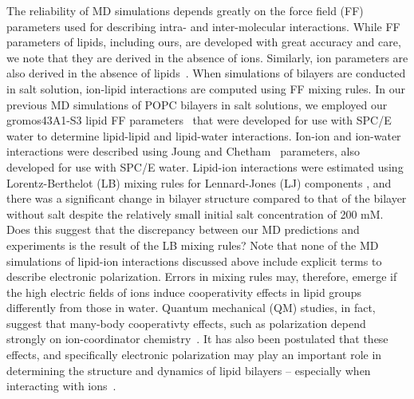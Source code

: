 \documentclass[12pt,openany,final]{book}
\begin{document}
The reliability of MD simulations depends greatly on the force field (FF) parameters 
used for describing intra- and inter-molecular interactions. 
While FF parameters of lipids, including ours, are developed with great accuracy and care, 
we note that they are derived in the absence of ions. 
Similarly, ion parameters are also derived in the absence of lipids~\cite{joung:2008}. 
When simulations of bilayers are conducted in salt solution, 
ion-lipid interactions are computed using FF mixing rules. 
In our previous MD simulations of POPC bilayers in salt solutions, 
we employed our gromos43A1-S3 lipid FF parameters~\cite{chiu:2009} 
that were developed for use with SPC/E water to determine lipid-lipid and lipid-water interactions. 
Ion-ion and ion-water interactions were described using Joung and Chetham~\cite{joung:2008} parameters, 
also developed for use with SPC/E water. 
Lipid-ion interactions were estimated using Lorentz-Berthelot (LB) 
mixing rules for Lennard-Jones (LJ) components
, and there was a significant change in bilayer 
structure compared to that of the bilayer without salt despite the relatively small initial salt concentration of 200 mM.
Does this suggest that the discrepancy between our MD predictions and experiments 
is the result of the LB mixing rules?  
Note that none of the MD simulations of lipid-ion interactions discussed above
include explicit terms to describe electronic polarization. 
Errors in mixing rules may, therefore, 
emerge if the high electric fields of ions induce 
cooperativity effects in lipid groups 
differently from those in water. 
Quantum mechanical (QM) studies, in fact, suggest that many-body 
cooperativty effects, such as polarization depend  
strongly on ion-coordinator chemistry~\cite{varma:2010,wineman:2019}. 
It has also been postulated that these effects, and specifically 
electronic 
polarization may play an
important role in determining the structure and dynamics of lipid
bilayers
-- especially when interacting with 
ions~\cite{vacha:2010,vorobyov:2010,melcr:2018,chen:2021,lee:2008:origin}.
\end{document}
